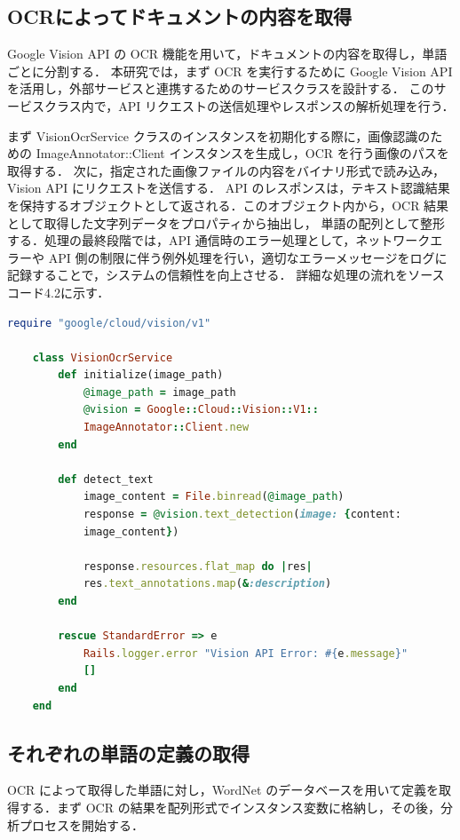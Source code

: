 \subsection{OCRによってドキュメントの内容を取得}
\label{subsec:app_ocr}

Google Vision API の OCR 機能を用いて，ドキュメントの内容を取得し，単語ごとに分割する．
本研究では，まず OCR を実行するために Google Vision API を活用し，外部サービスと連携するためのサービスクラスを設計する．
このサービスクラス内で，API リクエストの送信処理やレスポンスの解析処理を行う．

まず VisionOcrService クラスのインスタンスを初期化する際に，画像認識のための ImageAnnotator::Client インスタンスを生成し，OCR を行う画像のパスを取得する．
次に，指定された画像ファイルの内容をバイナリ形式で読み込み，Vision API にリクエストを送信する．
API のレスポンスは，テキスト認識結果を保持するオブジェクトとして返される．このオブジェクト内から，OCR 結果として取得した文字列データをプロパティから抽出し，
単語の配列として整形する．処理の最終段階では，API 通信時のエラー処理として，ネットワークエラーや API 側の制限に伴う例外処理を行い，適切なエラーメッセージをログに記録することで，システムの信頼性を向上させる．
詳細な処理の流れをソースコード4.2に示す．

\begin{lstlisting}[language=Ruby, caption=Ruby による OCR の実装]
    require "google/cloud/vision/v1"

    class VisionOcrService
        def initialize(image_path)
            @image_path = image_path
            @vision = Google::Cloud::Vision::V1::
            ImageAnnotator::Client.new
        end

        def detect_text
            image_content = File.binread(@image_path)
            response = @vision.text_detection(image: {content:
            image_content})

            response.resources.flat_map do |res|
            res.text_annotations.map(&:description)
        end

        rescue StandardError => e
            Rails.logger.error "Vision API Error: #{e.message}"
            []
        end
    end
\end{lstlisting}

\subsection{それぞれの単語の定義の取得}
\label{sebsec:app_synset}

OCR によって取得した単語に対し，WordNet のデータベースを用いて定義を取得する．まず OCR の結果を配列形式でインスタンス変数に格納し，その後，分析プロセスを開始する．

